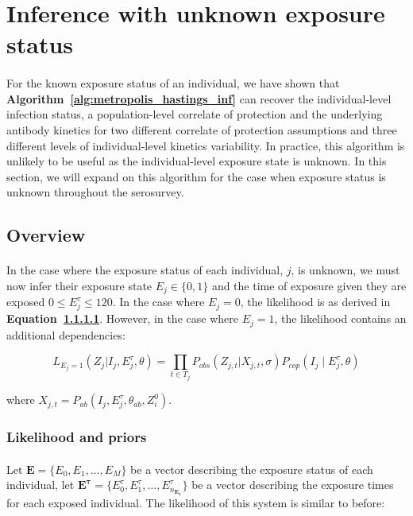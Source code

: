 \documentclass{article}
\begin{document}
\newpage
\section{Inference with unknown exposure status}

\paragraph{}For the known exposure status of an individual, we have shown that \textbf{Algorithm~\ref{alg:metropolis_hastings_inf}} can recover the individual-level infection status, a population-level correlate of protection and the underlying antibody kinetics for two different correlate of protection assumptions and three different levels of individual-level kinetics variability. In practice, this algorithm is unlikely to be useful as the individual-level exposure state is unknown. In this section, we will expand on this algorithm for the case when exposure status is unknown throughout the serosurvey. 

\subsection{Overview}

\paragraph{}In the case where the exposure status of each individual, $j$, is unknown, we must now infer their exposure state $E_j \in \{0, 1\}$ and the time of exposure given they are exposed $0 \leq E_j^\tau \leq 120$. In the case where $E_j = 0$, the likelihood is as derived in \textbf{Equation~\ref{}}. However, in the case where $E_j = 1$, the likelihood contains an additional dependencies:

\begin{equation}
L_{E_j = 1}(Z_{j}| I_j, E_j^\tau, \theta) = \prod_{t \in T_j}P_{obs}(Z_{j,t}|X_{j,t}, \sigma)P_{cop}(I_j \mid  E^\tau_{j}, \theta)
\end{equation}

where $X_{j,t} =P_{ab}( I_j,  E_j^\tau, \theta_{ab}, Z^0_i) $.

\subsubsection{Likelihood and priors}

\paragraph{}Let $\mathbf{E} = \{E_0, E_1, \dots, E_{M}\}$ be a vector describing the exposure status of each individual, let $\mathbf{E^{\tau}} = \{E^{\tau}_0, E^{\tau}_1, \dots, E^{\tau}_{n_\mathbf{E_1}}\}$ be a vector describing the exposure times for each exposed individual. The likelihood of this system is similar to before:
\end{document}
